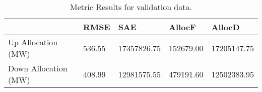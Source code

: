 \begin{table}[H] 
    \caption{Metric Results for validation data. \label{validation_res}}
    \begin{tabularx}{\textwidth}{CCCCC}
    \toprule
    & \textbf{RMSE}	& \textbf{SAE}	& \textbf{AllocF} & \textbf{AllocD}\\
    \midrule
    Up Allocation (MW) & 536.55 & 17357826.75 & 152679.00 & 17205147.75 \\
    Down Allocation (MW) & 408.99 & 12981575.55 & 479191.60 & 12502383.95 \\
        \bottomrule
    \end{tabularx}
\end{table}

